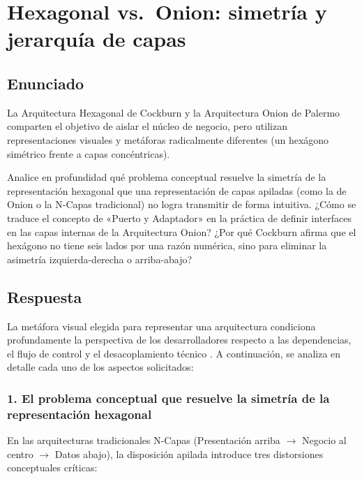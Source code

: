 \section{Hexagonal vs.\ Onion: simetría y jerarquía de capas}

\subsection{Enunciado}
La Arquitectura Hexagonal de Cockburn y la Arquitectura Onion de Palermo comparten el objetivo
de aislar el núcleo de negocio, pero utilizan representaciones visuales y metáforas radicalmente
diferentes (un hexágono simétrico frente a capas concéntricas).

Analice en profundidad qué problema conceptual resuelve la simetría de la representación
hexagonal que una representación de capas apiladas (como la de Onion o la N-Capas tradicional)
no logra transmitir de forma intuitiva. ¿Cómo se traduce el concepto de «Puerto y Adaptador» en
la práctica de definir interfaces en las capas internas de la Arquitectura Onion? ¿Por qué
Cockburn afirma que el hexágono no tiene seis lados por una razón numérica, sino para eliminar
la asimetría izquierda-derecha o arriba-abajo?

\subsection{Respuesta}
La metáfora visual elegida para representar una arquitectura condiciona profundamente la perspectiva de los desarrolladores respecto a las dependencias, el flujo de control y el desacoplamiento técnico \parencite{cockburn2005hexagonal,palermo2008onion,martin2017clean}. A continuación, se analiza en detalle cada uno de los aspectos solicitados:

\subsubsection*{1. El problema conceptual que resuelve la simetría de la representación hexagonal}

En las arquitecturas tradicionales N-Capas (Presentación arriba $\rightarrow$ Negocio al centro $\rightarrow$ Datos abajo), la disposición apilada introduce tres distorsiones conceptuales críticas:

